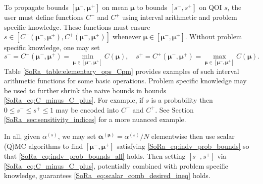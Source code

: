 \documentclass[graybox]{svmult}
\begin{document}
To propagate bounds $[\boldsymbol{\mu}^-,\boldsymbol{\mu}^+]$ on mean $\boldsymbol{\mu}$ to bounds $[s^-,s^+]$ on QOI $s$, the user must define functions $C^-$ and $C^+$ using interval arithmetic \cite{interval_analysis} and problem specific knowledge. These functions must ensure $s \in [C^-(\boldsymbol{\mu}^-,\boldsymbol{\mu}^+),C^+(\boldsymbol{\mu}^-,\boldsymbol{\mu}^+)]$ whenever $\boldsymbol{\mu} \in [\boldsymbol{\mu}^-,\boldsymbol{\mu}^+]$. Without problem specific knowledge, one may set 
\begin{equation}
    s^- = C^-(\boldsymbol{\mu}^-,\boldsymbol{\mu}^+) = \min_{\boldsymbol{\mu} \in [\boldsymbol{\mu}^-,\boldsymbol{\mu}^+]} C(\boldsymbol{\mu}), \quad 
    s^+= C^+(\boldsymbol{\mu}^-,\boldsymbol{\mu}^+) = \max_{\boldsymbol{\mu} \in [\boldsymbol{\mu}^-,\boldsymbol{\mu}^+]} C(\boldsymbol{\mu}).
    \label{SoRa_eq:C_minus_C_plus}
\end{equation}
Table \ref{SoRa_table:elementary_ops_Cpm} provides examples of such interval arithmetic functions for some basic operations. Problem specific knowledge may be used to further shrink the naive bounds in bounds \eqref{SoRa_eq:C_minus_C_plus}. For example, if $s$ is a probability then $0 \leq s^- \leq s^+ \leq 1$ may be encoded into $C^-$ and $C^+$. See Section \ref{SoRa_sec:sensitivity_indices} for a more nuanced example. 

In all, given $\alpha^{(s)}$, we may set $\boldsymbol{\alpha}^{(\boldsymbol{\mu})}=\alpha^{(s)}/N$ elementwise then use scalar (Q)MC  algorithms to find $[\boldsymbol{\mu}^-,\boldsymbol{\mu}^+]$ satisfying \eqref{SoRa_eq:indv_prob_bounds} so that \eqref{SoRa_eq:indv_prob_bounds_all} holds. Then setting $[s^-,s^+]$ via \eqref{SoRa_eq:C_minus_C_plus}, potentially combined with problem specific knowledge, guarantees \eqref{SoRa_eq:scalar_comb_desired_ineq} holds.
\end{document}
